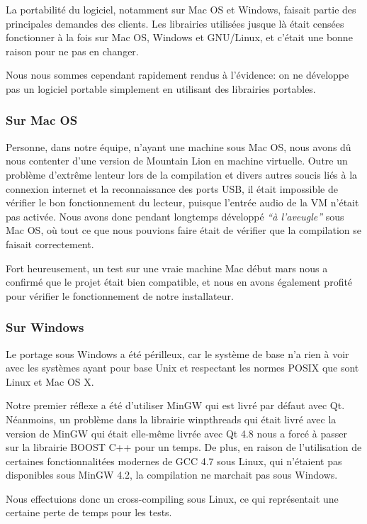 \documentclass[a4paper,11pt]{article}
\begin{document}
La portabilité du logiciel, notamment sur Mac OS et Windows, faisait partie des principales demandes des clients. Les librairies utilisées jusque là était censées fonctionner à la fois sur Mac OS, Windows et GNU/Linux, et c'était une bonne raison pour ne pas en changer.

Nous nous sommes cependant rapidement rendus à l'évidence: on ne développe pas un logiciel portable simplement en utilisant des librairies portables.

\subsubsection*{Sur Mac OS}

Personne, dans notre équipe, n'ayant une machine sous Mac OS, nous avons dû nous contenter d'une version de Mountain Lion en machine virtuelle. Outre un problème d'extrême lenteur lors de la compilation et divers autres soucis liés à la connexion internet et la reconnaissance des ports USB, il était impossible de vérifier le bon fonctionnement du lecteur, puisque l'entrée audio de la VM n'était pas activée. Nous avons donc pendant longtemps développé \textit{``à l'aveugle''} sous Mac OS, où tout ce que nous pouvions faire était de vérifier que la compilation se faisait correctement.

Fort heureusement, un test sur une vraie machine Mac début mars nous a confirmé que le projet était bien compatible, et nous en avons également profité pour vérifier le fonctionnement de notre installateur.

\subsubsection*{Sur Windows}

Le portage sous Windows a été périlleux, car le système de base n'a rien à voir avec les systèmes ayant pour base Unix et respectant
les normes POSIX que sont Linux et Mac OS X.

Notre premier réflexe a été d'utiliser MinGW qui est livré par défaut avec Qt. Néanmoins, un problème
dans la librairie winpthreads qui était livré avec la version de MinGW qui était elle-même livrée avec Qt 4.8 nous a
forcé à passer sur la librairie BOOST C++ pour un temps. De plus, en raison de l'utilisation de certaines fonctionnalitées modernes
de GCC 4.7 sous Linux, qui n'étaient pas disponibles sous MinGW 4.2, la compilation ne marchait pas sous Windows.

Nous effectuions donc un cross-compiling sous Linux, ce qui représentait une certaine perte de temps pour les tests.
\end{document}
